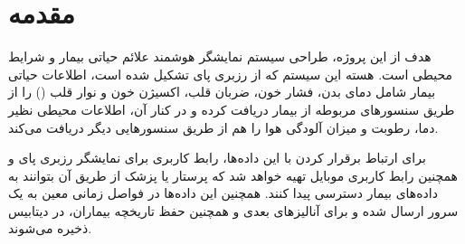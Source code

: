 \documentclass[12pt]{article}
\begin{document}
\newpage
\pagestyle{fancy}
\fancyhf{}
\fancyfoot{}
\cfoot{\thepage}
\chead{}

\newfontfamily{}

\KashidaOff
 \newcommand{\inlineLatin}[1]{
	\small{\lr{{\terminal #1}}}
}


\section{مقدمه}


هدف از این پروژه، طراحی سیستم نمایشگر هوشمند علائم حیاتی بیمار و شرایط محیطی است. هسته این سیستم که از رزبری پای تشکیل شده است، اطلاعات حیاتی بیمار شامل دمای بدن، فشار خون، ضربان قلب، اکسیژن خون و نوار قلب () را از طریق سنسور‌های مربوطه از بیمار دریافت کرده و در کنار آن، اطلاعات محیطی نظیر دما،‌ رطوبت و میزان آلودگی هوا را هم از طریق سنسورهایی دیگر دریافت می‌کند.

برای ارتباط برقرار کردن با این داده‌ها، رابط کاربری برای نمایشگر رزبری پای و همچنین رابط کاربری موبایل تهیه خواهد شد که پرستار یا پزشک از طریق آن بتوانند به داده‌های بیمار دسترسی پیدا کنند. همچنین این داده‌ها در فواصل زمانی معین به یک سرور ارسال شده و برای آنالیزهای بعدی و همچنین حفظ تاریخچه بیماران، در دیتابیس ذخیره می‌شوند.
\end{document}
